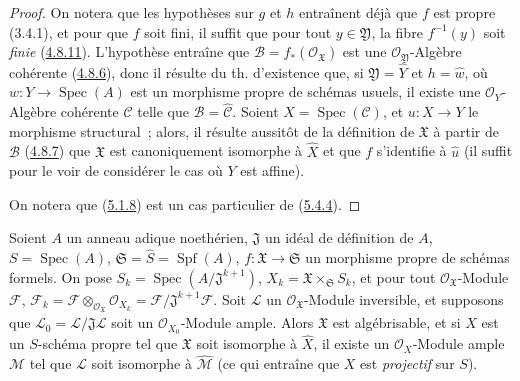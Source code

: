\begin{proof}
On notera que les hypothèses sur $g$ et $h$ entraînent déjà que $f$ est propre
(3.4.1), et pour que $f$ soit fini, il suffit que pour tout $y\in\mathfrak Y$, la
fibre $f^{-1}(y)$ soit \emph{finie} (\hyperref[III.4.8.11-fr]{4.8.11}). L'hypothèse
entraîne que $\mathcal B=f_*(\mathcal O_{\mathfrak X})$ est une
$\mathcal O_{\mathfrak Y}$-Algèbre cohérente
(\hyperref[III.4.8.6-fr]{4.8.6}), donc il résulte du th. d'existence que, si
$\mathfrak Y=\widehat Y$ et $h=\widehat w$, où
$w:Y\to\operatorname{Spec}(A)$ est un morphisme propre de schémas usuels, il
existe une $\mathcal O_Y$-Algèbre cohérente $\mathcal C$ telle que
$\mathcal B=\widehat{\mathcal C}$. Soient $X=\operatorname{Spec}(\mathcal C)$, et
$u:X\to Y$ le morphisme structural~; alors, il résulte aussitôt de la définition de
$\mathfrak X$ à partir de $\mathcal B$
(\hyperref[III.4.8.7-fr]{4.8.7}) que $\mathfrak X$ est canoniquement isomorphe à
$\widehat X$ et que $f$ s'identifie à $\widehat u$ (il suffit pour le voir de
considérer le cas où $Y$ est affine).

On notera que (\hyperref[III.5.1.8-fr]{5.1.8}) est un cas particulier de
(\hyperref[III.5.4.4-fr]{5.4.4}).
\end{proof}

\begin{theorem}[5.4.5]
\label{III.5.4.5-fr}
Soient $A$ un anneau adique noethérien, $\mathfrak J$ un idéal de définition de
$A$, $S=\operatorname{Spec}(A)$,
$\mathfrak S=\widehat S=\operatorname{Spf}(A)$,
$f:\mathfrak X\to\mathfrak S$ un morphisme propre de schémas formels. On pose
$S_k=\operatorname{Spec}(A/\mathfrak J^{k+1})$,
$X_k=\mathfrak X\times_{\mathfrak S}S_k$, et pour tout
$\mathcal O_{\mathfrak X}$-Module $\mathcal F$,
$\mathcal F_k=\mathcal F\otimes_{\mathcal O_{\mathfrak X}}\mathcal O_{X_k}
=\mathcal F/\mathfrak J^{k+1}\mathcal F$.
Soit $\mathcal L$ un $\mathcal O_{\mathfrak X}$-Module inversible, et supposons
que $\mathcal L_0=\mathcal L/\mathfrak J\mathcal L$ soit un
$\mathcal O_{X_0}$-Module ample. Alors $\mathfrak X$ est algébrisable, et si
$X$ est un $S$-schéma propre tel que $\mathfrak X$ soit isomorphe à
$\widehat X$, il existe un $\mathcal O_X$-Module ample $\mathcal M$ tel que
$\mathcal L$ soit isomorphe à $\widehat{\mathcal M}$ \textup{(ce qui entraîne que
$X$ est \emph{projectif} sur $S$)}.
\end{theorem}

